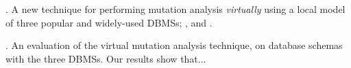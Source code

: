 . A new technique for performing mutation analysis {\it virtually} using a local model of three popular and widely-used DBMSs; \HyperSQL, \Postgres and \SQLite.

\vspace{1mm} . An evaluation of the virtual mutation analysis technique, on \numschemas database schemas with the three DBMSs. Our results show that...






